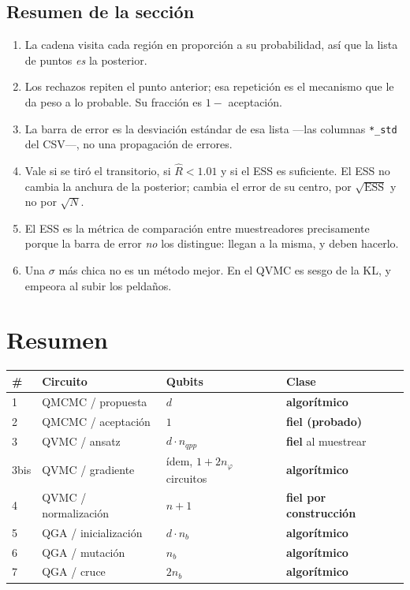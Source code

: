 \documentclass[11pt,a4paper]{article}
\newcommand{\Cu}[1]{\textcolor{cuantico}{\textbf{#1}}}
\newcommand{\Fi}[1]{\textcolor{fiel}{\textbf{#1}}}
\begin{document}
\subsection{Resumen de la sección}

\begin{enumerate}[leftmargin=1.6em]
  \item La cadena visita cada región en proporción a su probabilidad, así que
    la lista de puntos \emph{es} la posterior.
  \item Los rechazos repiten el punto anterior; esa repetición es el mecanismo
    que le da peso a lo probable. Su fracción es $1 -$ aceptación.
  \item La barra de error es la desviación estándar de esa lista ---las
    columnas \texttt{*\_std} del CSV---, no una propagación de errores.
  \item Vale si se tiró el transitorio, si $\hat{R} < 1.01$ y si el ESS es
    suficiente. El ESS no cambia la anchura de la posterior; cambia el error
    de su centro, por $\sqrt{\mathrm{ESS}}$ y no por $\sqrt{N}$.
  \item El ESS es la métrica de comparación entre muestreadores precisamente
    porque la barra de error \emph{no} los distingue: llegan a la misma, y
    deben hacerlo.
  \item Una $\sigma$ más chica no es un método mejor. En el QVMC es sesgo de
    la KL, y empeora al subir los peldaños.
\end{enumerate}

\clearpage
\section{Resumen}

\begin{center}
\small
\begin{tabular}{llll}
\toprule
\textbf{\#} & \textbf{Circuito} & \textbf{Qubits} & \textbf{Clase} \\
\midrule
1 & QMCMC / propuesta        & $d$            & \Cu{algorítmico} \\
2 & QMCMC / aceptación       & $1$            & \Fi{fiel (probado)} \\
3 & QVMC / ansatz            & $d\cdot n_{qpp}$ & \Fi{fiel} al muestrear \\
3bis & QVMC / gradiente      & ídem, $1+2n_\varphi$ circuitos & \Cu{algorítmico} \\
4 & QVMC / normalización     & $n+1$          & \Fi{fiel por construcción} \\
5 & QGA / inicialización     & $d\cdot n_b$   & \Cu{algorítmico} \\
6 & QGA / mutación           & $n_b$          & \Cu{algorítmico} \\
7 & QGA / cruce              & $2 n_b$        & \Cu{algorítmico} \\
\bottomrule
\end{tabular}
\end{center}
\end{document}
